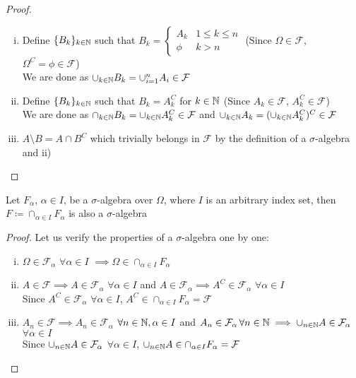 \begin{proof}
	\begin{enumerate}[i)]
		\item Define $\{B_k\}_{k \in \mathbb N}$ such that $B_k=\begin{cases}
			A_k & 1\leq k \leq n \\
			\phi & k>n 
			\end{cases}$ (Since $\Omega \in \mathcal F$, $\Omega^C=\phi \in \mathcal F$) \\
			We are done as $\cup_{k \in \mathbb N} B_k=\cup_{i=1}^n A_i \in \mathcal F$
		\item Define $\{B_k\}_{k \in \mathbb N}$ such that $B_k=A_k^C$ for $k \in \mathbb N$ (Since $A_k \in \mathcal F$, $A_k^C \in \mathcal F$) \\
			We are done as $\cap_{k \in \mathbb N} B_k=\cup_{k \in \mathbb N} A_k^C \in \mathcal F$ and $\cup_{k \in \mathbb N} A_k=(\cup_{k \in \mathbb N} A_k^C)^C \in \mathcal F$
		\item $A \setminus B = A \cap B^C$ which trivially belongs in $\mathcal F$ by the definition of a $\sigma$-algebra and ii)
	\end{enumerate}
\end{proof}

\begin{lemma}
	Let $F_\alpha$, $\alpha \in I$, be a $\sigma$-algebra over $\Omega$, where $I$ is an arbitrary index set, then $F \coloneqq \cap_{\alpha \in I} F_\alpha$ is also a $\sigma$-algebra
\end{lemma}

\begin{proof}
	Let us verify the properties of a $\sigma$-algebra one by one:
	\begin{enumerate}[i)]
		\item $\Omega \in \mathcal F_\alpha$ $\forall \alpha \in I$ $\implies \Omega \in  \cap_{\alpha \in I} F_\alpha$
		\item $A \in \mathcal F \implies A \in \mathcal F_\alpha$ $\forall \alpha \in I$ and $A \in \mathcal F_\alpha \implies A^C \in \mathcal F_\alpha$ $\forall \alpha \in I$ \\
		Since $A^C \in \mathcal F_\alpha$ $\forall \alpha \in I$, $A^C \in \cap_{\alpha \in I} F_\alpha = \mathcal F$
		\item $A_n \in \mathcal F \implies A_n \in \mathcal F_\alpha$ $\forall n \in \mathbb N,\alpha \in I$ and $A_n \in \mathcal F_\alpha \,\forall n \in \mathbb N \implies \cup_{n \in \mathbb N} A \in \mathcal F_\alpha$ $\forall \alpha \in I$ \\
		Since $\cup_{n \in \mathbb N} A \in \mathcal F_\alpha$ $\forall \alpha \in I$, $\cup_{n \in \mathbb N} A \in \cap_{\alpha \in I} F_\alpha = \mathcal F$
	\end{enumerate}
\end{proof}


